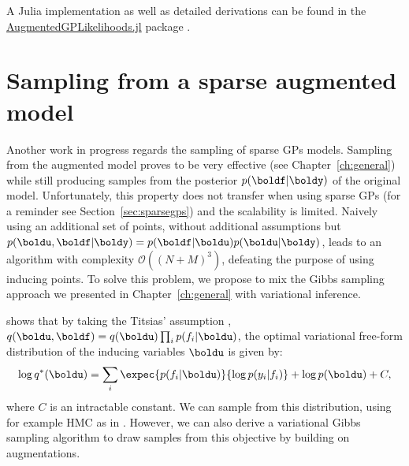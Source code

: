 A Julia implementation as well as detailed derivations can be found in the \href{https://github.com/JuliaGaussianProcesses/AugmentedGPLikelihoods.jl}{AugmentedGPLikelihoods.jl} package \cite{theo_galy_fajou_2022_6347022}.

\section{Sampling from a sparse augmented model}

Another work in progress regards the sampling of sparse \ac{GPs} models.
Sampling from the augmented model proves to be very effective (see Chapter~\ref{ch:general}) while still producing samples from the posterior $p(\boldf|\boldy)$ of the original model.
Unfortunately, this property does not transfer when using sparse \ac{GPs} (for a reminder see Section~\ref{sec:sparsegps}) and the scalability is limited.
Naively using an additional set of points, without additional assumptions but $p(\boldu,\boldf|\boldy) = p(\boldf|\boldu)p(\boldu|\boldy)$, leads to an algorithm with complexity $\mathcal{O}((N+M)^3)$, defeating the purpose of using inducing points.
To solve this problem, we propose to mix the Gibbs sampling approach we presented in Chapter~\ref{ch:general} with variational inference.

\citet{hensmanMCMCVariationallySparse2015} shows that by taking the Titsias'  assumption \cite{Titsias2009}, $q(\boldu,\boldf) = q(\boldu)\prod_i p(f_i|\boldu)$, the optimal variational free-form distribution of the inducing variables $\boldu$ is given by:
\begin{align}
    \log q^*(\boldu) = \sum_{i}\expec{p(f_i|\boldu)}{\log p(y_i|f_i)} + \log p(\boldu) + C,\label{eq:obj_hensman}
\end{align}
where $C$ is an intractable constant.
We can sample from this distribution, using for example \ac{HMC} as in \cite{hensmanMCMCVariationallySparse2015}.
However, we can also derive a variational Gibbs sampling algorithm to draw samples from this objective by building on augmentations.\\

